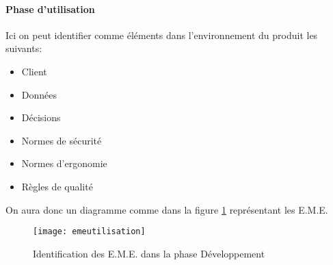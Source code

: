 


\paragraph{Phase d'utilisation}
Ici on peut identifier comme éléments dans l'environnement du produit les suivants:
\begin{itemize}
    \item Client 
    \item Données
    \item Décisions
    \item Normes de sécurité 
    \item Normes d'ergonomie
    \item Règles de qualité
\end{itemize}
On aura donc un diagramme comme dans la figure \ref{fig:emeutilisation} représentant les E.M.E.

\begin{figure}[H]
    \centering
    \texttt{[image: emeutilisation]}
    \caption{Identification des E.M.E. dans la phase Développement}
    \label{fig:emeutilisation}
\end{figure}



